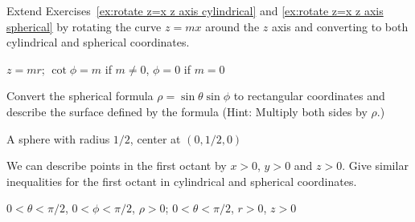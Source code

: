 \begin{enumialphparenastyle}
\begin{ex}
Extend Exercises~\ref{ex:rotate z=x z axis cylindrical} 
and \ref{ex:rotate z=x z axis spherical} by rotating the curve $z=mx$
around the $z$ axis and converting to both cylindrical and spherical
coordinates.
\begin{sol}
	$z=mr$; $\cot\phi=m$ if $m\neq0$, $\phi=0$ if $m=0$
\end{sol}
\end{ex}

\begin{ex}
Convert the spherical formula $\rho=\sin \theta \sin \phi$ to
rectangular coordinates and describe the surface defined by the
formula (Hint: Multiply both sides by $\rho$.)
\begin{sol}
	A sphere with radius $1/2$, center at $(0,1/2,0)$
\end{sol}
\end{ex}

\begin{ex}
We can describe points in the first octant by $x >0$, $y>0$ and
$z>0$.  Give similar inequalities for the first octant in cylindrical
and spherical coordinates.
\begin{sol}
	$0<\theta<\pi/2$, $0<\phi<\pi/2$, $\rho>0$;
$0<\theta<\pi/2$, $r>0$, $z>0$
\end{sol}
\end{ex}

\end{enumialphparenastyle}